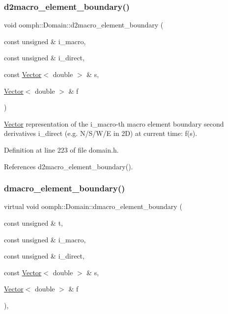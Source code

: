 \subsubsection{\texorpdfstring{d2macro\+\_\+element\+\_\+boundary()}{d2macro\_element\_boundary()}\hspace{0.1cm}{\footnotesize\ttfamily [2/2]}}
{\footnotesize\ttfamily void oomph\+::\+Domain\+::d2macro\+\_\+element\+\_\+boundary (\begin{DoxyParamCaption}\item[{const unsigned \&}]{i\+\_\+macro,  }\item[{const unsigned \&}]{i\+\_\+direct,  }\item[{const \hyperlink{classoomph_1_1Vector}{Vector}$<$ double $>$ \&}]{s,  }\item[{\hyperlink{classoomph_1_1Vector}{Vector}$<$ double $>$ \&}]{f }\end{DoxyParamCaption})\hspace{0.3cm}{\ttfamily [inline]}}



\hyperlink{classoomph_1_1Vector}{Vector} representation of the i\+\_\+macro-\/th macro element boundary second derivatives i\+\_\+direct (e.\+g. N/\+S/\+W/E in 2D) at current time\+: f(s). 



Definition at line 223 of file domain.\+h.



References d2macro\+\_\+element\+\_\+boundary().

\mbox{\label{classoomph_1_1Domain_ae573c54363a8e9d33951e59208a9bc39}} 
\subsubsection{\texorpdfstring{dmacro\+\_\+element\+\_\+boundary()}{dmacro\_element\_boundary()}\hspace{0.1cm}{\footnotesize\ttfamily [1/2]}}
{\footnotesize\ttfamily virtual void oomph\+::\+Domain\+::dmacro\+\_\+element\+\_\+boundary (\begin{DoxyParamCaption}\item[{const unsigned \&}]{t,  }\item[{const unsigned \&}]{i\+\_\+macro,  }\item[{const unsigned \&}]{i\+\_\+direct,  }\item[{const \hyperlink{classoomph_1_1Vector}{Vector}$<$ double $>$ \&}]{s,  }\item[{\hyperlink{classoomph_1_1Vector}{Vector}$<$ double $>$ \&}]{f }\end{DoxyParamCaption})\hspace{0.3cm}{\ttfamily [inline]}, {\ttfamily [virtual]}}




